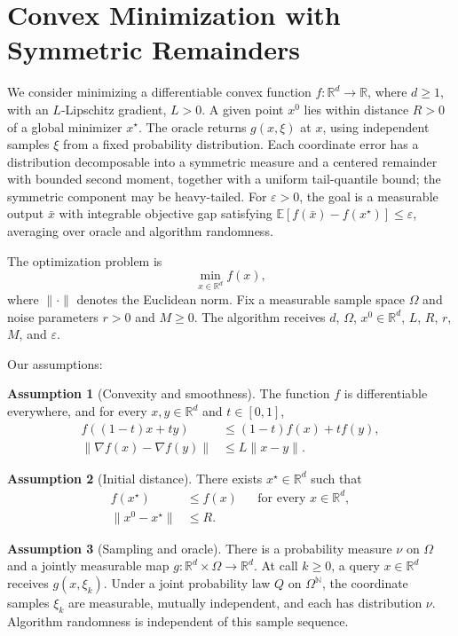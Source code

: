 \documentclass[10pt]{article}
\theoremstyle{definition}
\newtheorem{assumption}{Assumption}
\begin{document}
\section*{Convex Minimization with Symmetric Remainders}
We consider minimizing a differentiable convex function $f:\mathbb{R}^d\to\mathbb{R}$, where $d\geq1$, with an $L$-Lipschitz gradient, $L>0$. A given point $x^0$ lies within distance $R>0$ of a global minimizer $x^\star$. The oracle returns $g(x,\xi)$ at $x$, using independent samples $\xi$ from a fixed probability distribution. Each coordinate error has a distribution decomposable into a symmetric measure and a centered remainder with bounded second moment, together with a uniform tail-quantile bound; the symmetric component may be heavy-tailed. For $\varepsilon>0$, the goal is a measurable output $\bar{x}$ with integrable objective gap satisfying $\mathbb{E}[f(\bar{x})-f(x^\star)]\leq\varepsilon$, averaging over oracle and algorithm randomness.

The optimization problem is
\[
\min_{x\in\mathbb{R}^d} f(x),
\]
where $\|\cdot\|$ denotes the Euclidean norm. Fix a measurable sample space $\Omega$ and noise parameters $r>0$ and $M\geq0$. The algorithm receives $d$, $\Omega$, $x^0\in\mathbb{R}^d$, $L$, $R$, $r$, $M$, and $\varepsilon$.

Our assumptions:
\begin{assumption}[Convexity and smoothness]
The function $f$ is differentiable everywhere, and for every $x,y\in\mathbb{R}^d$ and $t\in[0,1]$,
\[
\begin{aligned}
f((1-t)x+ty)&\leq(1-t)f(x)+tf(y),\\
\|\nabla f(x)-\nabla f(y)\|&\leq L\|x-y\|.
\end{aligned}
\]
\end{assumption}

\begin{assumption}[Initial distance]
There exists $x^\star\in\mathbb{R}^d$ such that
\[
\begin{aligned}
f(x^\star)&\leq f(x) &&\text{for every }x\in\mathbb{R}^d,\\
\|x^0-x^\star\|&\leq R.
\end{aligned}
\]
\end{assumption}

\begin{assumption}[Sampling and oracle]
There is a probability measure $\nu$ on $\Omega$ and a jointly measurable map $g:\mathbb{R}^d\times\Omega\to\mathbb{R}^d$. At call $k\geq0$, a query $x\in\mathbb{R}^d$ receives $g(x,\xi_k)$. Under a joint probability law $Q$ on $\Omega^{\mathbb{N}}$, the coordinate samples $\xi_k$ are measurable, mutually independent, and each has distribution $\nu$. Algorithm randomness is independent of this sample sequence.
\end{assumption}
\end{document}
